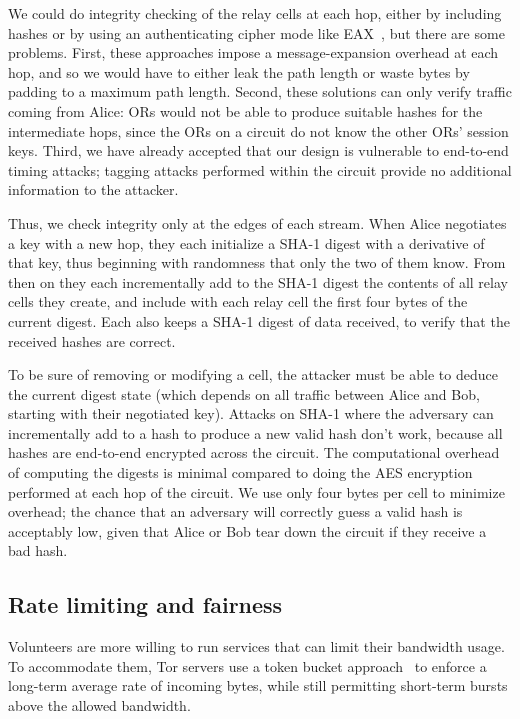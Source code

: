 \documentclass[twocolumn]{article}
\begin{document}
We could do integrity checking of the relay cells at each hop, either
by including hashes or by using an authenticating cipher mode like
EAX~\cite{eax}, but there are some problems. First, these approaches
impose a message-expansion overhead at each hop, and so we would have to
either leak the path length or waste bytes by padding to a maximum
path length. Second, these solutions can only verify traffic coming
from Alice: ORs would not be able to produce suitable hashes for
the intermediate hops, since the ORs on a circuit do not know the
other ORs' session keys. Third, we have already accepted that our design
is vulnerable to end-to-end timing attacks; tagging attacks performed
within the circuit provide no additional information to the attacker.

Thus, we check integrity only at the edges of each stream. When Alice
negotiates a key with a new hop, they each initialize a SHA-1
digest with a derivative of that key,
thus beginning with randomness that only the two of them know. From
then on they each incrementally add to the SHA-1 digest the contents of
all relay cells they create, and include with each relay cell the
first four bytes of the current digest.  Each also keeps a SHA-1
digest of data received, to verify that the received hashes are correct.

To be sure of removing or modifying a cell, the attacker must be able
to deduce the current digest state (which depends on all
traffic between Alice and Bob, starting with their negotiated key).
Attacks on SHA-1 where the adversary can incrementally add to a hash
to produce a new valid hash don't work, because all hashes are
end-to-end encrypted across the circuit.  The computational overhead
of computing the digests is minimal compared to doing the AES
encryption performed at each hop of the circuit. We use only four
bytes per cell to minimize overhead; the chance that an adversary will
correctly guess a valid hash
is
acceptably low, given that Alice or Bob tear down the circuit if they
receive a bad hash.

\subsection{Rate limiting and fairness}
\label{subsec:rate-limit}

Volunteers are more willing to run services that can limit
their bandwidth usage. To accommodate them, Tor servers use a
token bucket approach~\cite{tannenbaum96} to
enforce a long-term average rate of incoming bytes, while still
permitting short-term bursts above the allowed bandwidth.
\end{document}
